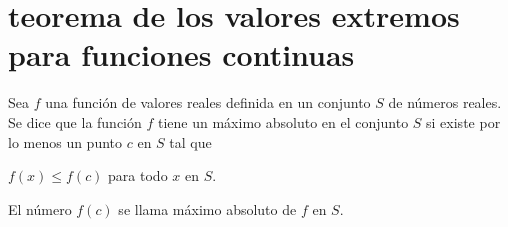 \begin{comment}
    \item Si $h(x)=af(x)+b,$ donde $a\neq 0,$ demostrar que $M_h=M_f$. Esto prueba que funciones distintas pueden conducir al mismo promedio. Interpretar geométricamente este teorema comparando las gráficas de $h$ y $f.$\\\\
	Demostración.-\; Sea $h(x)=af(x)+b$ con $a\neq 0$. Entonces, $h$ tiene un inverso ya que es estrictamente monótona (esto es porque la composición de $f$ y la función lineal $ax+b,$ ambas son estrictamente monótonas para $a\neq 0$). De donde su inversa está dada por,
	$$h^{-1}(x)=f^{-1}\left(\dfrac{x-b}{a}\right).$$
	Así,
	$$\begin{array}{rcl}
	    M_h &=& h^{-1}\left(\dfrac{1}{n}\sum_{i=1}^n h(a_i)\right)\\\\
		&=& h^{-1}\left(\dfrac{1}{n}\sum_{i=1}^n [af(a_i)+b]\right)\\\\
		&=&f^{-1} \left(\dfrac{\left[\sum_{i=1}^n f(a_i)\right]+b-b}{a}\right)\\\\
		&=& h^{-1}\left[\dfrac{a}{n}\left(\sum_{i=1}^n f(a_i)\right)+b\right]\\\\
		&=& g\left(\dfrac{1}{n}\sum_{i=1}^n f(a_i)\right)\\\\
		&=& M_f.\\\\
	\end{array}$$

\end{enumerate}

\end{comment}

\section{teorema de los valores extremos para funciones continuas}

\begin{tcolorbox}
    \begin{def.}
	Sea $f$ una función de valores reales definida en un conjunto $S$ de números reales. Se dice que la función $f$ tiene un máximo absoluto en el conjunto $S$ si existe por lo menos un punto $c$ en $S$ tal que 
	\begin{center}
	    $f(x)\leq f(c)$ para todo $x$ en $S$.
	\end{center}
	El número $f(c)$ se llama máximo absoluto de $f$ en $S$. 
    \end{def.}
\end{tcolorbox}

